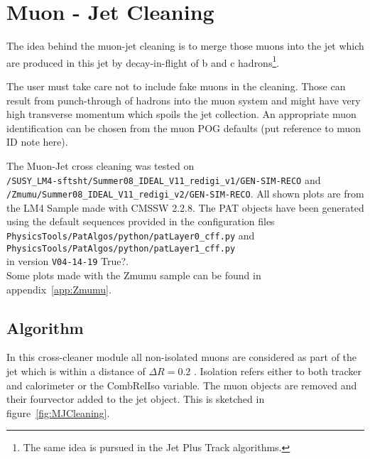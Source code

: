 \documentclass{cmspaper}
\begin{document}
\clearpage


\section{Muon - Jet Cleaning}
The idea behind the muon-jet cleaning is to merge those muons into the jet which
are produced in this jet by decay-in-flight of b and c hadrons\footnote{The same
idea is pursued in the Jet Plus Track algorithms.}.

The user must take care not to include fake muons in the cleaning. Those can
result from punch-through of hadrons into the muon system and might have very
high transverse momentum which spoils the jet collection. An appropriate muon
identification can be chosen from the muon POG defaults {\color{red}(put
reference to muon ID note here)}.

The Muon-Jet cross cleaning was tested on \\
\texttt{/SUSY\_LM4-sftsht/Summer08\_IDEAL\_V11\_redigi\_v1/GEN-SIM-RECO} and\\
\texttt{/Zmumu/Summer08\_IDEAL\_V11\_redigi\_v2/GEN-SIM-RECO}.
All shown plots are from the LM4 Sample made with CMSSW 2.2.8. The PAT objects
have been generated using the default sequences provided in the configuration
files\\
\texttt{PhysicsTools/PatAlgos/python/patLayer0\_cff.py} and\\
\texttt{PhysicsTools/PatAlgos/python/patLayer1\_cff.py} \\
in version {\color{red}\texttt{V04-14-19} True?}.
\\
Some plots made with the Zmumu sample can be found in appendix~\ref{app:Zmumu}.


\subsection{Algorithm}
In this cross-cleaner module all non-isolated muons are considered as part of
the jet which is within a distance of $\Delta R=0.2$ . Isolation refers either
to both tracker and calorimeter or the CombRelIso variable. The muon objects are
removed and their fourvector added to the jet object. 
This is sketched in figure~\ref{fig:MJCleaning}.
\end{document}
